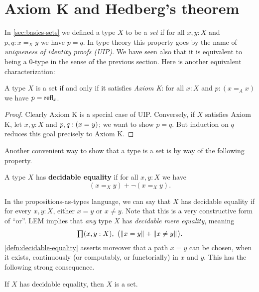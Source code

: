 \section{Axiom K and Hedberg's theorem}
\label{sec:hedberg}

In \autoref{sec:basics-sets} we defined a type $X$ to be a \emph{set} if for all $x, y : X$ and $p, q : x =_X y$ we have $p = q$.
In type theory this property goes by the name of \emph{uniqueness of identity proofs (UIP)}.
We have seen also that it is equivalent to being a $0$-type in the sense of the previous section.
Here is another equivalent characterization:

\begin{thm}\label{thm:h-set-uip-K}
 A type $X$ is a set if and only if it satisfies \emph{Axiom K}: for all $x : X$ and $p : (x =_A x)$ we have $p = \mathsf{refl}_{x}$.
\end{thm}

\begin{proof}
  Clearly Axiom K is a special case of UIP.
  Conversely, if $X$ satisfies Axiom K, let $x, y : X$ and $p, q : (x =_{} y)$; we want to show $p=q$.
  But induction on $q$ reduces this goal precisely to Axiom K.
\end{proof}

Another convenient way to show that a type is a set is by way of the following property.

\begin{defn}\label{defn:decidable-equality}
 A type $X$ has \textbf{decidable equality} if for all $x, y : X$ we have
 \[(x =_X y) + \neg (x =_X y).\]
\end{defn}

In the propositions-as-types language, we can say that $X$ has decidable equality if for every $x,y:X$, either $x=y$ or $x\neq y$.
Note that this is a very constructive form of ``or''.
LEM implies that \emph{any} type $X$ has \emph{decidable mere equality}, meaning
\[\prd{x,y:X} \big(\brck{x=y} + \brck{x\neq y}\big).\]
\autoref{defn:decidable-equality} asserts moreover that a path $x=y$ can be chosen, when it exists, continuously (or computably, or functorially) in $x$ and $y$.
This has the following strong consequence.

\begin{thm}[Hedberg]\label{thm:hedberg}
  If $X$ has decidable equality, then $X$ is a set.
\end{thm}

